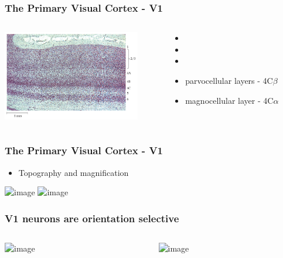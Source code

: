 \documentclass[]{beamer}
\begin{document}
\begin{frame}
 \frametitle{The Primary Visual Cortex - V1}
\begin{overlayarea}{113mm}{69mm}
\begin{columns}[T]
 \begin{column}{50mm}
\includegraphics[width=60mm]{figs/l3/v1_layers.png}
 \end{column}

 \begin{column}{60mm}
\begin{itemize}
 \setlength{\itemsep}{5pt}
 \item[]
 \item[]
 \item[]
 \item parvocellular layers - 4C$\beta$
 \item magnocellular layer - 4C$\alpha$
\end{itemize}
 \end{column}
\end{columns}
\end{overlayarea}
\end{frame}


\begin{frame}
 \frametitle{The Primary Visual Cortex - V1}
\begin{itemize}
 \item<1> Topography and magnification
\end{itemize}

\begin{center}
\includegraphics<1>[width=60mm]{figs/l3/magnification_topography.png}
\includegraphics<2>[width=100mm]{figs/l3/snellen_magnification.png}
\end{center}
\end{frame}

\begin{frame}
 \frametitle{V1 neurons are orientation selective}
\begin{columns}[T]
 \begin{column}{55mm}
\begin{center}
\includegraphics<1->[width=50mm]{figs/l3/ori_tuning.png}
\end{center}
 \end{column}

 \begin{column}{55mm}
\begin{center}
\includegraphics<2>[width=50mm]{figs/l3/simple_cell_model.png}
\end{center}
 \end{column}
\end{columns}
\end{frame}
\end{document}

